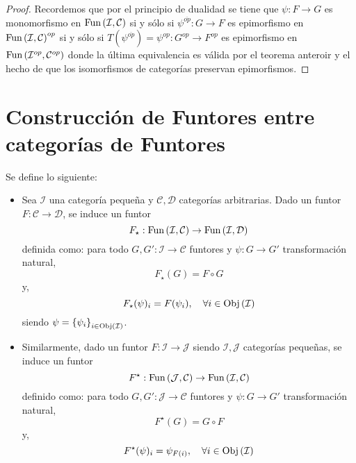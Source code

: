 \documentclass[12pt]{report}
\newcounter{it}
\theoremstyle{largebreak}
\newcommand\cf[3]{\ensuremath{#1:#2\rightarrow#3}}
\newcommand{\Obj}[1]{\ensuremath{\textup{Obj}\left(#1\right)}}
\newcommand{\Fun}[2]{\ensuremath{\textup{Fun}\left(#1,#2\right)}}
\begin{document}
    \begin{proof}
        Recordemos que por el principio de dualidad se tiene que $\cf{\psi}{F}{G}$ es monomorfismo en $\Fun{\mathcal{I}}{\mathcal{C}}$ si y sólo si $\cf{\psi^{\overline{op}}}{G}{F}$ es epimorfismo en $\Fun{\mathcal{I}}{\mathcal{C}}^{op}$ si y sólo si $\cf{T(\psi^{\overline{op}})=\psi^{op}}{G^{op}}{F^{op}}$ es epimorfismo en $\Fun{\mathcal{I}^{op}}{\mathcal{C}^{op}}$ donde la última equivalencia es válida por el teorema anteroir y el hecho de que los isomorfismos de categorías preservan epimorfismos.
    \end{proof}

    \section{Construcción de Funtores entre categorías de Funtores}

    \begin{mydef}
        Se define lo siguiente:
        \begin{itemize}
            \item Sea $\mathcal{I}$ una categoría pequeña y $\mathcal{C},\mathcal{D}$ categorías arbitrarias. Dado un funtor $\cf{F}{\mathcal{C}}{\mathcal{D}}$, se induce un funtor
            \begin{equation*}
                \cf{F_{\star}}{\Fun{\mathcal{I}}{\mathcal{C}}}{\Fun{\mathcal{I}}{\mathcal{D}}}
            \end{equation*}
            definida como: para todo $\cf{G,G'}{\mathcal{I}}{\mathcal{C}}$ funtores y $\cf{\psi}{G}{G'}$ transformación natural,
            \begin{equation*}
                F_\star(G)=F\circ G
            \end{equation*}
            y,
            \begin{equation*}
                F_\star(\psi)_i=F(\psi_i),\quad\forall i\in\Obj{\mathcal{I}}
            \end{equation*}
            siendo $\psi=\left\{\psi_i \right\}_{ i\in\Obj{\mathcal{I}}}$.
            \item Similarmente, dado un funtor $\cf{F}{\mathcal{I}}{\mathcal{J}}$ siendo $\mathcal{I},\mathcal{J}$ categorías pequeñas, se induce un funtor
            \begin{equation*}
                \cf{F^\star}{\Fun{\mathcal{J}}{\mathcal{C}}}{\Fun{\mathcal{I}}{\mathcal{C}}}
            \end{equation*}
            definido como: para todo $\cf{G,G'}{\mathcal{J}}{\mathcal{C}}$ funtores y $\cf{\psi}{G}{G'}$ transformación natural,
            \begin{equation*}
                F^\star(G)=G\circ F
            \end{equation*}
            y,
            \begin{equation*}
                F^\star(\psi)_i=\psi_{ F(i)},\quad\forall i\in\Obj{\mathcal{I}}
            \end{equation*}
        \end{itemize}
    \end{mydef}
\end{document}
